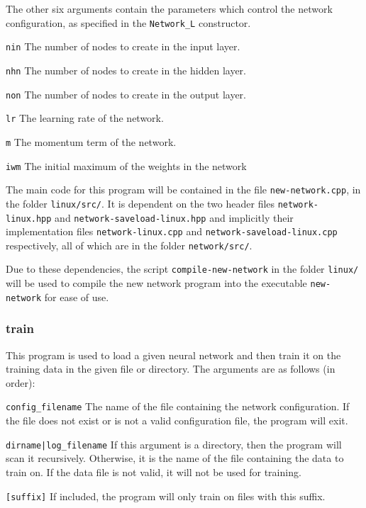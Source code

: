 \documentclass[a4paper]{article}
\begin{document}
The other six arguments contain the parameters which control the network configuration, as specified in the \lstinline{Network_L} constructor.

\lstinline{nin} The number of nodes to create in the input layer.

\lstinline{nhn} The number of nodes to create in the hidden layer.

\lstinline{non} The number of nodes to create in the output layer.

\lstinline{lr} The learning rate of the network.

\lstinline{m} The momentum term of the network.

\lstinline{iwm} The initial maximum of the weights in the network

The main code for this program will be contained in the file \lstinline{new-network.cpp}, in the folder \lstinline{linux/src/}. It is dependent on the two header files \lstinline{network-linux.hpp} and \lstinline{network-saveload-linux.hpp} and implicitly their implementation files \lstinline{network-linux.cpp} and \lstinline{network-saveload-linux.cpp} respectively, all of which are in the folder \lstinline{network/src/}.

Due to these dependencies, the script \lstinline{compile-new-network} in the folder \lstinline{linux/} will be used to compile the new network program into the executable \lstinline{new-network} for ease of use.

\subsubsection{train}
\label{subsubsec:dc_csa_train}

This program is used to load a given neural network and then train it on the training data in the given file or directory. The arguments are as follows (in order):

\lstinline{config_filename} The name of the file containing the network configuration. If the file does not exist or is not a valid configuration file, the program will exit.

\lstinline{dirname|log_filename} If this argument is a directory, then the program will scan it recursively. Otherwise, it is the name of the file containing the data to train on. If the data file is not valid, it will not be used for training.

\lstinline{[suffix]} If included, the program will only train on files with this suffix. 
\end{document}
